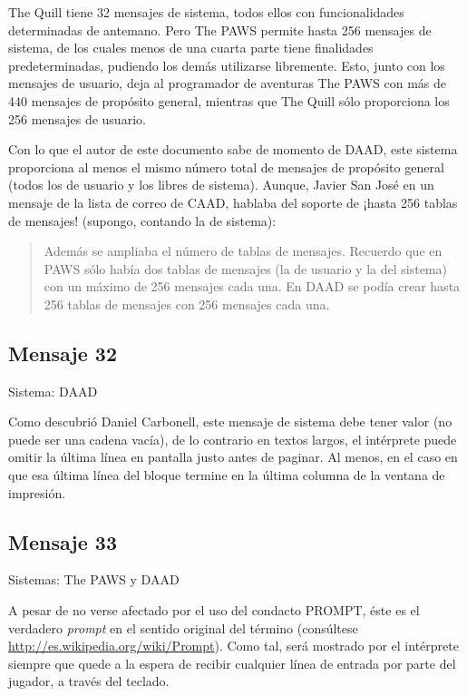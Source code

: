 \documentclass[11pt, a5paper]{article}
\newcommand{\quill}{\textsf{The Quill}\xspace}
\newcommand{\paw}{\textsf{The PAWS}\xspace}
\newcommand{\daad}{\textsf{DAAD}\xspace}
\newcommand{\sistema}[1]{\noindent Sistema: #1 \nopagebreak}
\newcommand{\sistemas}[1]{\noindent Sistemas: #1 \nopagebreak}
\begin{document}
\quill tiene 32 mensajes de sistema, todos ellos con funcionalidades determinadas de antemano. Pero \paw permite hasta 256 mensajes de sistema, de los cuales menos de una cuarta parte tiene finalidades predeterminadas, pudiendo los demás utilizarse libremente. Esto, junto con los mensajes de usuario, deja al programador de aventuras \paw con más de 440 mensajes de propósito general, mientras que \quill sólo proporciona los 256 mensajes de usuario.

Con lo que el autor de este documento sabe de momento de \daad, este sistema proporciona al menos el mismo número total de mensajes de propósito general (todos los de usuario y los libres de sistema). Aunque, Javier San José en un mensaje \cite{JSJ} de la lista de correo de CAAD, hablaba del soporte de ¡hasta 256 tablas de mensajes! (supongo, contando la de sistema):

\begin{quote}
\guillemotleft Además se ampliaba el número de tablas de mensajes. Recuerdo que en PAWS sólo había dos tablas de mensajes (la de usuario y la del sistema) con un máximo de 256 mensajes cada una. En \daad se podía crear hasta 256 tablas de mensajes con 256 mensajes cada una.\guillemotright
\end{quote}

\subsection{Mensaje 32}

\sistema{\daad}

Como descubrió Daniel Carbonell, este mensaje de sistema debe tener valor (no puede ser una cadena vacía), de lo contrario en textos largos, el intérprete puede omitir la última línea en pantalla justo antes de paginar. Al menos, en el caso en que esa última línea del bloque termine en la última columna de la ventana de impresión.

\subsection{Mensaje 33}

\sistemas{\paw y \daad}

A pesar de no verse afectado por el uso del condacto PROMPT, éste es el verdadero \emph{prompt} en el sentido original del término (consúltese \url{http://es.wikipedia.org/wiki/Prompt}). Como tal, será mostrado por el intérprete siempre que quede a la espera de recibir cualquier línea de entrada por parte del jugador, a través del teclado.
\end{document}
